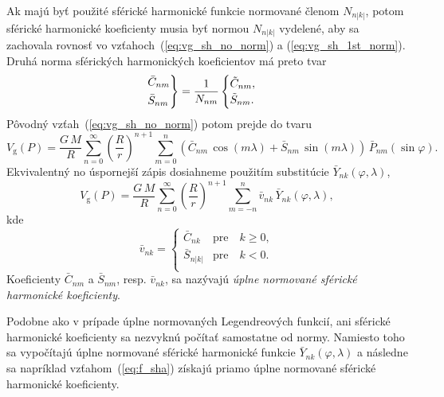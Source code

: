 \documentclass[a4paper, 12pt]{book}
\newcommand{\gidx}{\mathrm g}
\begin{document}
Ak majú byť použité sférické harmonické funkcie normované členom $N_{n|k|}$, 
potom sférické harmonické koeficienty musia byť normou $N_{n|k|}$ vydelené, aby 
sa zachovala rovnosť vo vzťahoch~(\ref{eq:vg_sh_no_norm}) 
a (\ref{eq:vg_sh_1st_norm}).  Druhá norma sférických harmonických koeficientov 
má preto tvar
%
\begin{equation}
\begin{rcases}
\bar{C}_{nm}\\
\bar{S}_{nm}
\end{rcases}
= \frac{1}{N_{nm}}
\begin{cases}
\tilde{C}_{nm}{,}\\
\tilde{S}_{nm}{.}
\end{cases}
\end{equation}
%
Pôvodný vzťah~(\ref{eq:vg_sh_no_norm}) potom prejde do tvaru
%
\begin{equation}
\label{eq:vg_sh_2nd_norm}
V_\gidx(P) = \frac{G \, M}{R} \sum_{n = 0}^\infty \left( \frac{R}{r} \right)^{n 
+ 1} \sum_{m = 0}^{n} \left( \bar{C}_{nm} \, \cos(m\lambda) + \bar{S}_{nm} \, 
\sin(m\lambda)\right) \, \bar{P}_{nm}(\sin\varphi){.}
\end{equation}
%
Ekvivalentný no úspornejší zápis dosiahneme použitím substitúcie 
$\bar{Y}_{nk}(\varphi, \lambda)$,
%
\begin{equation}
\label{eq:vg_sh_2nd_norm_ynk}
V_\gidx(P) = \frac{G \, M}{R} \sum_{n = 0}^\infty \left( \frac{R}{r} \right)^{n 
+ 1} \sum_{m = -n}^{n} \bar{v}_{nk} \, \bar{Y}_{nk}(\varphi, \lambda){,}
\end{equation}
kde
%
\begin{equation}
\bar{v}_{nk} =
%
\begin{cases}
\bar{C}_{nk}  &\text{pre} \quad k \geq 0{,}\\
\bar{S}_{n|k|}  &\text{pre} \quad k < 0{.}\\
\end{cases}
\end{equation}
%
Koeficienty $\bar{C}_{nm}$ a $\bar{S}_{nm}$, resp. $\bar{v}_{nk}$, sa nazývajú 
\emph{úplne normované sférické harmonické koeficienty}.

Podobne ako v prípade úplne normovaných Legendreových funkcií, ani sférické 
harmonické koeficienty sa nezvyknú počítať samostatne od normy.  Namiesto toho 
sa vypočítajú úplne normované sférické harmonické funkcie 
$\bar{Y}_{nk}(\varphi, \lambda)$ a následne sa napríklad 
vzťahom~(\ref{eq:f_sha}) získajú priamo úplne normované sférické harmonické 
koeficienty.
\end{document}
